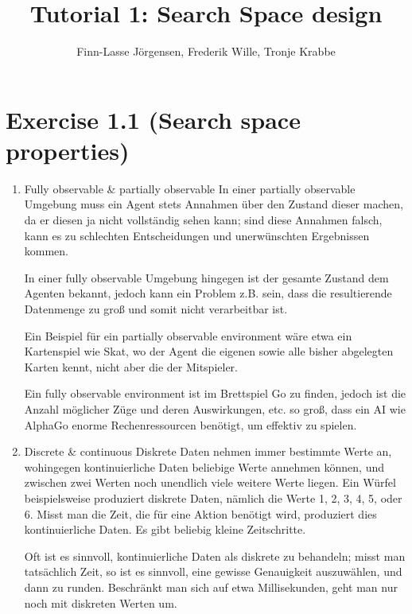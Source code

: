 \documentclass[12pt,a4paper]{article}
\author{Finn-Lasse Jörgensen, Frederik Wille, Tronje Krabbe}
\title{Tutorial 1: Search Space design}
\begin{document}
\maketitle


\section*{Exercise 1.1 (Search space properties)}
\begin{enumerate}
    \item Fully observable \& partially observable
        In einer partially observable Umgebung muss ein Agent stets Annahmen
        über den Zustand dieser machen, da er diesen ja nicht vollständig sehen kann;
        sind diese Annahmen falsch, kann es zu schlechten Entscheidungen
        und unerwünschten Ergebnissen kommen.

        In einer fully observable Umgebung hingegen ist der gesamte Zustand dem Agenten
        bekannt, jedoch kann ein Problem z.B. sein, dass die resultierende Datenmenge
        zu groß und somit nicht verarbeitbar ist.

        Ein Beispiel für ein partially observable environment wäre etwa ein Kartenspiel
        wie Skat, wo der Agent die eigenen sowie alle bisher abgelegten Karten
        kennt, nicht aber die der Mitspieler.

        Ein fully observable environment ist im Brettspiel Go zu finden, jedoch
        ist die Anzahl möglicher Züge und deren Auswirkungen, etc. so groß,
        dass ein AI wie AlphaGo enorme Rechenressourcen benötigt, um effektiv zu spielen.

    \item Discrete \& continuous
        Diskrete Daten nehmen immer bestimmte Werte an, wohingegen kontinuierliche
        Daten beliebige Werte annehmen können, und zwischen zwei Werten noch unendlich
        viele weitere Werte liegen. Ein Würfel beispielsweise produziert diskrete Daten,
        nämlich die Werte 1, 2, 3, 4, 5, oder 6. Misst man die Zeit, die für eine Aktion
        benötigt wird, produziert dies kontinuierliche Daten. Es gibt beliebig kleine
        Zeitschritte.

        Oft ist es sinnvoll, kontinuierliche Daten als diskrete zu behandeln; misst man
        tatsächlich Zeit, so ist es sinnvoll, eine gewisse Genauigkeit auszuwählen,
        und dann zu runden. Beschränkt man sich auf etwa Millisekunden, geht man nur noch
        mit diskreten Werten um.


\end{enumerate}
\end{document}
